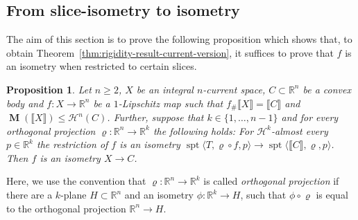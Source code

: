 \documentclass[reqno]{amsart}
\newtheorem{proposition}[theorem]{Proposition}
\numberwithin{equation}{section}
\newcommand{\R}{\mathbb{R}}
\newcommand{\spt}{\operatorname{spt}}
\newcommand{\bb}[1]{\llbracket #1\rrbracket}
\newcommand{\susbet}{\subset}
\DeclareMathOperator{\mass}{\mathbf{M}}
\renewcommand{\rho}{\varrho}
\begin{document}
\subsection{From slice-isometry to isometry}\label{sec:4.2}
The aim of this section is to prove the following proposition which shows that, to obtain Theorem~\ref{thm:rigidity-result-current-version}, it suffices to prove that $f$ is an isometry when restricted to certain slices. 
\begin{proposition}\label{lemm:step-1}
Let \(n\geq 2\),  \(X\) be an integral $n$-current space, $C\subset \mathbb{R}^n$ be a convex body and \(f\colon X\to \mathbb{R}^n\) be a \(1\)-Lipschitz map
such that \(f_\# \bb{X}=\bb{C}\) and \(\mass(\bb{X})\leq \mathcal{H}^n(C)\). Further, suppose that \(k\in \{1, \dots, n-1\}\) and for every orthogonal projection $\rho\colon  \mathbb{R}^n\to \mathbb{R}^{k}$ the following holds: \textnormal{For $\mathcal{H}^k$-almost every $p\in \R^{k}$ the restriction of $f$ is an isometry $\spt \langle T ,\rho \circ f,p \rangle \to \spt \langle \bb{C} ,\rho,p \rangle$.} Then $f$ is an isometry $X\to C$.
\end{proposition}

Here, we use the convention that $\rho\colon  \mathbb{R}^n\to \mathbb{R}^{k}$ is called \emph{orthogonal projection} if there are a \(k\)-plane \(H\susbet \R^n\) and an isometry \(\phi\colon \R^k \to H\), such that \(\phi \circ \rho\) is equal to the orthogonal projection \(\R^n \to H\).
\end{document}
